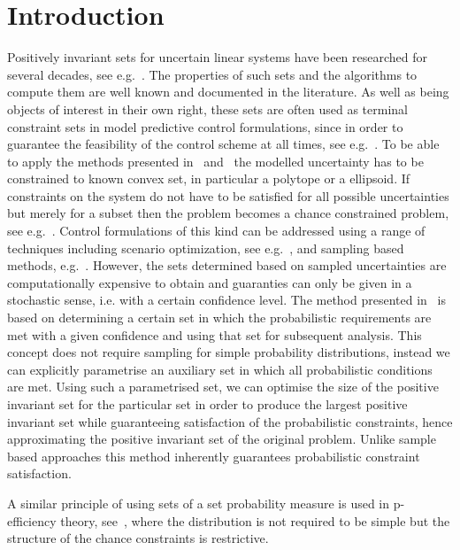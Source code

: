 \documentclass{ifacconf}
\begin{document}
\section{Introduction}
%
%
Positively invariant sets for uncertain linear systems have been researched for several decades, see e.g.~\cite{Kolmanovsky:1995,Kolmanovsky:1998,blanchini:2007}.
%
The properties of such sets and the algorithms to compute them are well known and documented in the literature.
%
As well as being objects of interest in their own right,
these sets are often used as terminal constraint sets in model predictive control formulations, since in order to guarantee the feasibility of the control scheme at all times, see e.g.~\cite{Mayne2014}.
%
To be able to apply the methods presented in~\cite{Kolmanovsky:1998} and~\cite{blanchini:2007} the modelled uncertainty has to be constrained to known convex set, in particular a polytope or a ellipsoid.
%
If constraints on the system do not have to be satisfied for all possible uncertainties but merely for a subset then the problem becomes a chance constrained problem, see e.g.~\cite{Kall2010}.
%
Control formulations of this kind can be addressed using a range of techniques including scenario optimization, see e.g.~\cite{Calafiore2010}, and sampling based methods, e.g.~\cite{Margellos2014,Zhang2015}.
%
However, the sets determined based on sampled uncertainties are computationally expensive to obtain and guaranties can only be given in a stochastic sense, i.e. with a certain confidence level.
%
The method presented in~\cite{Zhang2015} is based on determining a certain set in which the probabilistic requirements are met with a given confidence and using that set for subsequent analysis.
%
This concept does not require sampling for simple probability distributions, instead we can explicitly parametrise an auxiliary set in which all probabilistic conditions are met.
%
Using such a parametrised set, we can optimise the size of the positive invariant set for the particular set in order to produce the largest positive invariant set while guaranteeing satisfaction of the probabilistic constraints, hence approximating the positive invariant set of the original problem.
%
Unlike sample based approaches this method inherently guarantees probabilistic constraint satisfaction.

A similar principle of using sets of a set probability measure is used in p-efficiency theory, see~\cite{Dentcheva2009}, where the distribution is not required to be simple but the structure of the chance constraints is restrictive.
\end{document}
